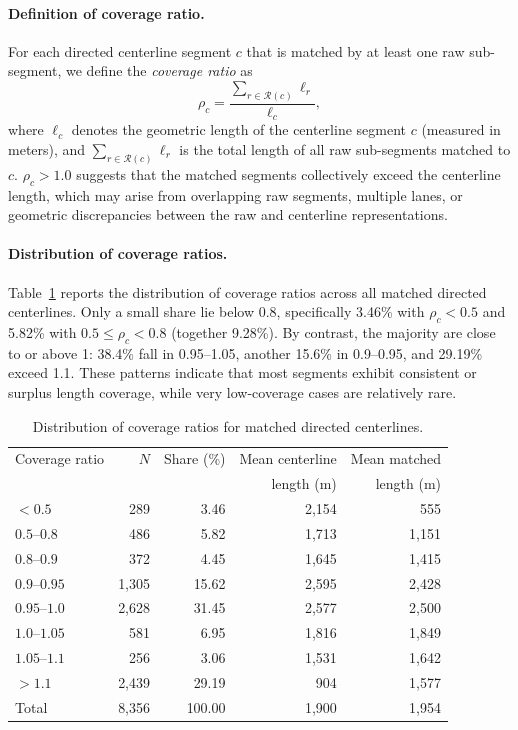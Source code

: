 \documentclass[12pt]{article}
\begin{document}
	\paragraph{Definition of coverage ratio.}
	For each directed centerline segment $c$ that is matched by at least one raw
	sub-segment, we define the \emph{coverage ratio} as
	\begin{equation}
		\rho_c = \frac{\sum_{r \in \mathcal{R}(c)} \ell_r}{\ell_c},
	\end{equation}
	where $\ell_c$ denotes the geometric length of the centerline segment $c$ (measured in meters), and $\sum_{r \in \mathcal{R}(c)} \ell_r$ is the total length of all raw sub-segments matched to $c$.  $\rho_c > 1.0$ suggests that the matched segments collectively exceed the centerline length, which may arise from overlapping raw segments, multiple lanes, or geometric	discrepancies between the raw and centerline representations.

	\paragraph{Distribution of coverage ratios.}
	Table~\ref{tab:coverage-ratio-distribution} reports the distribution of coverage ratios across all matched directed centerlines. Only a small share lie below 0.8, specifically 3.46\% with $\rho_c < 0.5$ and 5.82\% with $0.5 \le \rho_c < 0.8$ (together 9.28\%). By contrast, the majority are close to or above 1: 38.4\% fall in 0.95--1.05, another 15.6\% in 0.9--0.95, and 29.19\% exceed 1.1. These patterns indicate that most segments exhibit consistent or surplus length coverage, while very low-coverage cases are relatively rare.

	\begin{table}[h!]
		\centering
		\caption{Distribution of coverage ratios for matched directed centerlines.}
		\label{tab:coverage-ratio-distribution}
		\begin{tabular}{l r r r r}
			\toprule
			Coverage ratio & $N$ & Share (\%) & Mean centerline & Mean matched \\
			& & & length (m) & length (m) \\
			\midrule
			$< 0.5$ & 289 & 3.46 & 2,154 & 555 \\
			$0.5$--$0.8$ & 486 & 5.82 & 1,713 & 1,151 \\
			$0.8$--$0.9$ & 372 & 4.45 & 1,645 & 1,415 \\
			$0.9$--$0.95$ & 1,305 & 15.62 & 2,595 & 2,428 \\
			$0.95$--$1.0$ & 2,628 & 31.45 & 2,577 & 2,500 \\
			$1.0$--$1.05$ & 581 & 6.95 & 1,816 & 1,849 \\
			$1.05$--$1.1$ & 256 & 3.06 & 1,531 & 1,642 \\
			$> 1.1$ & 2,439 & 29.19 & 904 & 1,577 \\
			\midrule
			Total & 8,356 & 100.00 & 1,900 & 1,954 \\
			\bottomrule
		\end{tabular}
	\end{table}
\end{document}
